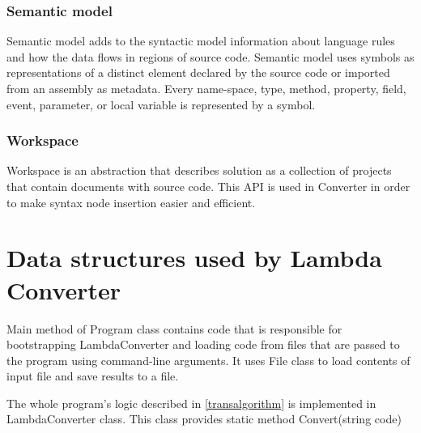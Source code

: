 \documentclass[]{report}
\begin{document}
    \subsubsection{Semantic model}
    Semantic model adds to the syntactic model information about language rules and how the data flows in regions of source code. 
    Semantic model uses symbols as representations of a distinct element declared by the source code or imported from an assembly as metadata. Every name-space, type, method, property, field, event, parameter, or local variable is represented by a symbol\cite{roslynoverview}.
    
    \subsubsection{Workspace}
    Workspace is an abstraction that describes solution as a collection of projects that contain documents with source code. This API is used in Converter in order to make syntax node insertion easier and efficient.
    
    \section{Data structures used by Lambda Converter}   
    Main method of Program class contains code that is responsible for bootstrapping LambdaConverter and loading code from files that are passed to the program using command-line arguments. It uses File class to load contents of input file and save results to a file.
    
    The whole program's logic described in \ref{transalgorithm}  is implemented in  LambdaConverter class. This class provides static method Convert(string code) 
    
\end{document}
